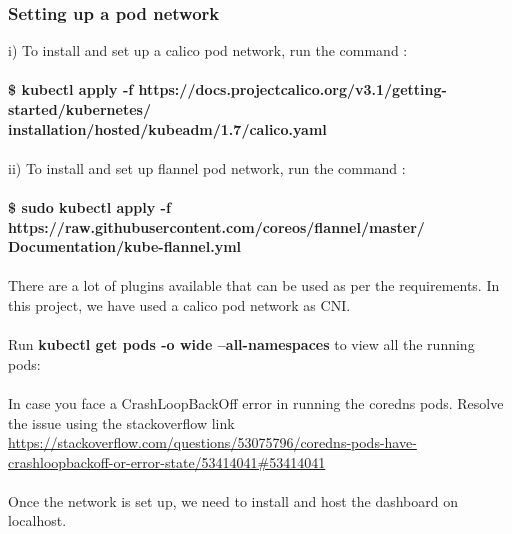 \documentclass[12pt]{article}
\begin{document}
\subsubsection{Setting up a pod network}
i) To install and set up a calico pod network, run the command :\\\\
\textbf{\$ kubectl apply -f https://docs.projectcalico.org/v3.1/getting-started/kubernetes/\\installation/hosted/kubeadm/1.7/calico.yaml}\\\\
ii) To install and set up flannel pod network, run the command :\\\\
\textbf{\$ sudo kubectl apply -f https://raw.githubusercontent.com/coreos/flannel/master/\\Documentation/kube-flannel.yml}\\\\
There are a lot of plugins available that can be used as per the requirements. In this project, we have used a calico pod network as CNI.\\\\
Run \textbf{kubectl get pods -o wide --all-namespaces} to view all the running pods:\\\\
In case you face a CrashLoopBackOff error in running the coredns pods. Resolve the issue using the stackoverflow link \href{https://stackoverflow.com/questions/53075796/coredns-pods-have-crashloopbackoff-or-error-state/53414041#53414041}{https://stackoverflow.com/questions/53075796/coredns-pods-have-crashloopbackoff-or-error-state/53414041\#53414041}\cite{Coredns} \\\\
Once the network is set up, we need to install and host the dashboard on localhost.
\end{document}
